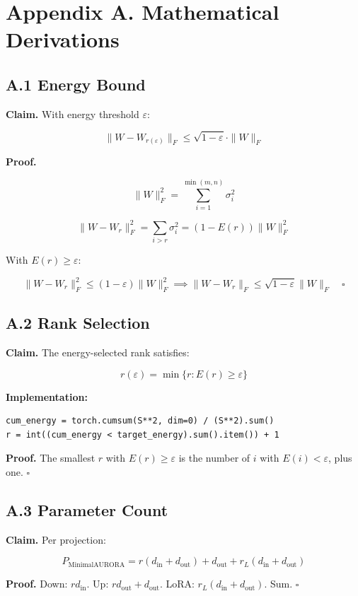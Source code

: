 \section{Appendix A. Mathematical Derivations}

\subsection{A.1 Energy Bound}

\textbf{Claim.} With energy threshold $\varepsilon$:

\[
\|W - W_{r(\varepsilon)}\|_F \leq \sqrt{1 - \varepsilon} \cdot \|W\|_F
\]

\textbf{Proof.}

\[
\|W\|_F^2 = \sum_{i=1}^{\min(m,n)} \sigma_i^2
\]

\[
\|W - W_r\|_F^2 = \sum_{i > r} \sigma_i^2 = (1 - E(r)) \|W\|_F^2
\]

With $E(r) \geq \varepsilon$:

\[
\|W - W_r\|_F^2 \leq (1 - \varepsilon) \|W\|_F^2 \implies \|W - W_r\|_F \leq \sqrt{1 - \varepsilon} \|W\|_F \quad \square
\]

\subsection{A.2 Rank Selection}

\textbf{Claim.} The energy-selected rank satisfies:

\[
r(\varepsilon) = \min\{r : E(r) \geq \varepsilon\}
\]

\textbf{Implementation:}

\begin{lstlisting}
cum_energy = torch.cumsum(S**2, dim=0) / (S**2).sum()
r = int((cum_energy < target_energy).sum().item()) + 1
\end{lstlisting}

\textbf{Proof.} The smallest $r$ with $E(r) \geq \varepsilon$ is the number of 
$i$ with $E(i) < \varepsilon$, plus one. $\square$

\subsection{A.3 Parameter Count}

\textbf{Claim.} Per projection:

\[
P_\text{MinimalAURORA} = r(d_\text{in} + d_\text{out}) + d_\text{out} + r_L(d_\text{in} + d_\text{out})
\]

\textbf{Proof.} Down: $r d_\text{in}$. Up: $r d_\text{out} + d_\text{out}$. LoRA: $r_L(d_\text{in} + d_\text{out})$. Sum. $\square$

